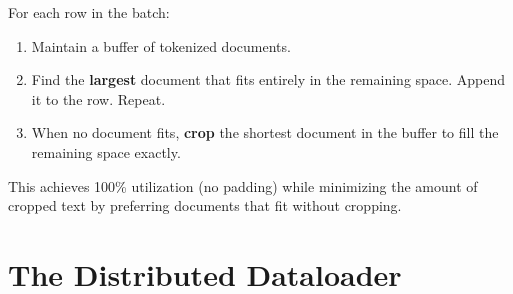 For each row in the batch:
\begin{enumerate}
  \item Maintain a buffer of tokenized documents.
  \item Find the \textbf{largest} document that fits entirely in the remaining space.  Append it to the row.  Repeat.
  \item When no document fits, \textbf{crop} the shortest document in the buffer to fill the remaining space exactly.
\end{enumerate}

This achieves 100\% utilization (no padding) while minimizing the amount of cropped text by preferring documents that fit without cropping.


\section{The Distributed Dataloader}

